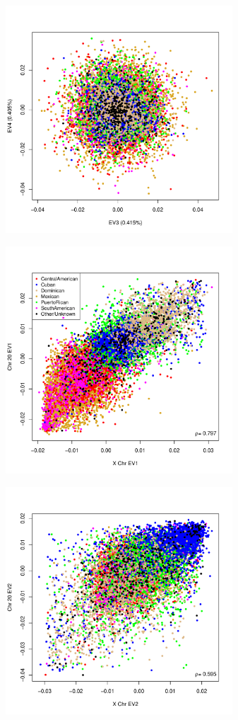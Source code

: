 \documentclass{beamer}
\begin{document}
\begin{frame}
\centering
\begin{figure}
\includegraphics[height=8.5cm]{../pca_chr20_ev34_col.pdf}
\end{figure}
\end{frame}

\begin{frame}
\centering
\begin{figure}
\includegraphics[height=8.5cm]{../pca_chr20_x_ev1_col.pdf}
\end{figure}
\end{frame}

\begin{frame}
\centering
\begin{figure}
\includegraphics[height=8.5cm]{../pca_chr20_x_ev2_col.pdf}
\end{figure}
\end{frame}
\end{document}
